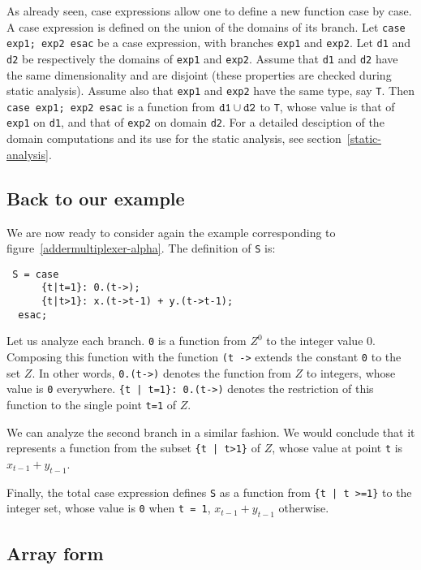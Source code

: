  As already seen, case expressions allow one to
define a new function case by case. A case expression is defined on
the union of the domains of its branch. Let {\tt case exp1; exp2 esac}
be a case expression, with branches {\tt exp1} and {\tt exp2}. Let
{\tt d1} and {\tt d2} be respectively the domains of {\tt exp1} and
{\tt exp2}. Assume that {\tt d1} and {\tt d2} have the same
dimensionality and are disjoint (these properties are checked during
static analysis). Assume also that {\tt exp1} and {\tt exp2} have the
same type, say {\tt T}.  Then {\tt case exp1; exp2 esac} is a function
from ${\tt d1} \cup {\tt d2}$ to {\tt T}, whose value is that of {\tt
exp1} on {\tt d1}, and that of {\tt exp2} on domain {\tt d2}. For 
a detailed desciption of the domain computations and its use for the
static analysis, see section~\ref{static-analysis}.

\subsection*{Back to our example}
We are now ready to consider again the example corresponding to figure~\ref{addermultiplexer-alpha}. The definition of {\tt S} is:
\begin{verbatim}
 S = case
      {t|t=1}: 0.(t->);
      {t|t>1}: x.(t->t-1) + y.(t->t-1);
  esac;
\end{verbatim}
Let us analyze each branch. {\tt 0} is a function from $Z^0$ to 
the integer value $0$. Composing this function with the function 
\texttt{(t ->} extends the constant {\tt 0} to the set $Z$. In other 
words, {\tt 0.(t->)} denotes the function from $Z$ to integers,
whose value is {\tt 0} everywhere. 
{\tt \{t | t=1\}: 0.(t->)} denotes the restriction of this function 
to the single point {\tt t=1} of $Z$. 

We can analyze the second branch in a similar fashion. We would conclude
that it represents a function from the subset {\tt \{t | t>1\}} of $Z$, 
whose value at point {\tt t} is $x_{t-1} + y_{t-1}$. 

Finally, the total case expression defines {\tt S} as a function from
{\tt \{t | t >=1\}} to the integer set, whose value is {\tt 0} 
when {\tt t = 1}, $x_{t-1}+ y_{t-1}$ otherwise.

\subsection{Array form}

